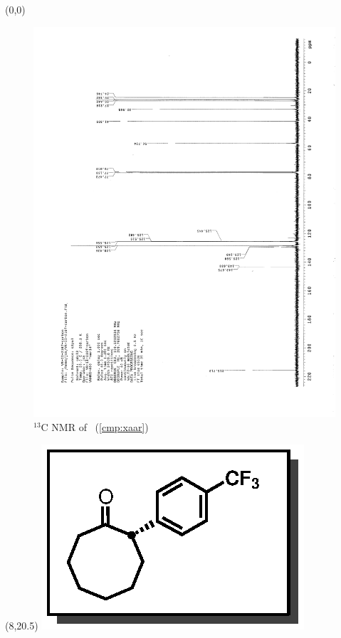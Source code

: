 \clearpage
\begin{textblock}{20}(0,0)
\begin{figure}[htb]
\caption{$^{13}$C NMR of  \CMPxaar\ (\ref{cmp:xaar})}
\includegraphics[scale=0.75, trim = 0mm 0mm 0mm 5mm,
clip]{chp_asymmetric/images/nmr/xaarC}
\vspace{-100pt}
\end{figure}
\end{textblock}
\begin{textblock}{1}(8,20.5)
\includegraphics[scale=0.8, angle=90]{chp_asymmetric/images/xaar}
\end{textblock}
\clearpage


